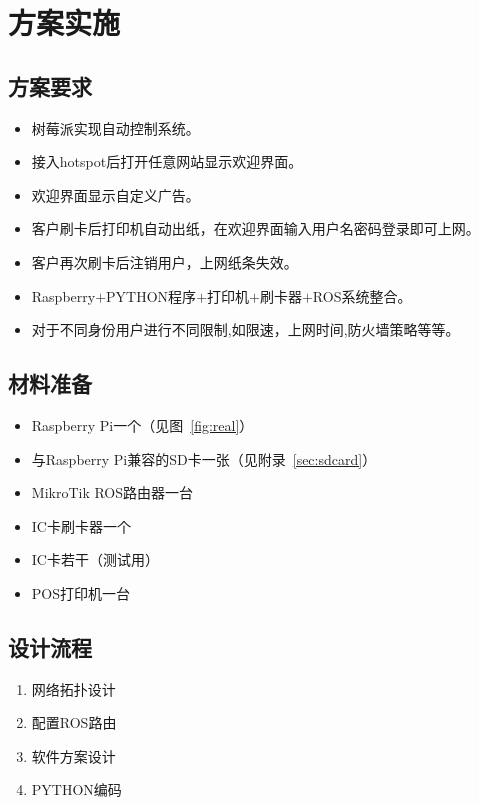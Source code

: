 \chapter{方案实施}

\section{方案要求}

\begin{itemize}
\item 树莓派实现自动控制系统。
\item 接入hotspot后打开任意网站显示欢迎界面。
\item 欢迎界面显示自定义广告。
\item 客户刷卡后打印机自动出纸，在欢迎界面输入用户名密码登录即可上网。
\item 客户再次刷卡后注销用户，上网纸条失效。
\item Raspberry$+$PYTHON程序$+$打印机$+$刷卡器$+$ROS系统整合。
\item 对于不同身份用户进行不同限制,如限速，上网时间,防火墙策略等等。
\end{itemize}

\section{材料准备}

\begin{itemize}
\item Raspberry Pi一个（见图~\ref{fig:real}）
\item 与Raspberry Pi兼容的SD卡一张（见附录~\ref{sec:sdcard}）
\item MikroTik ROS路由器一台
\item IC卡刷卡器一个
\item IC卡若干（测试用）
\item POS打印机一台
\end{itemize}

\section{设计流程}

\begin{enumerate}
\item 网络拓扑设计
\item 配置ROS路由
\item 软件方案设计
\item PYTHON编码
\end{enumerate}

